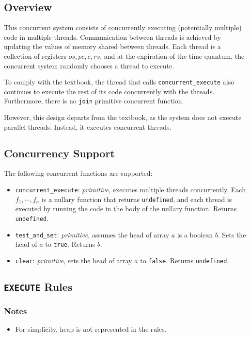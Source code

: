 \subsection{Overview}
\label{sec:org3a177cd}
This concurrent system consists of concurrently executing (potentially multiple) code in multiple threads. Communication between threads is achieved by updating the values of memory shared between threads. Each thread is a collection of registers \(\textit{os}, \textit{pc}, \textit{e}, \textit{rs}\), and at the expiration of the time quantum, the concurrent system randomly chooses a thread to execute.

To comply with the textbook, the thread that calls \texttt{concurrent\_execute} also continues to execute the rest of its code concurrently with the threads. Furthermore, there is no \texttt{join} primitive concurrent function.

However, this design departs from the textbook, as the system does not execute parallel threads. Instead, it executes concurrent threads.

\subsection{Concurrency Support}
\label{sec:orgaa84fb2}
The following concurrent functions are supported:
\begin{itemize}
\item \texttt{concurrent\_execute}: \textit{primitive}, executes multiple threads concurrently. Each \(f_1, \cdots ,f_n\) is a nullary function that returns \texttt{undefined}, and each thread is executed by running the code in the body of the nullary function. Returns \texttt{undefined}.
\item \texttt{test\_and\_set}: \textit{primitive}, assumes the head of array \(a\) is a boolean \(b\). Sets the head of \(a\) to \texttt{true}. Returns \(b\).
\item \texttt{clear}: \textit{primitive}, sets the head of array \(a\) to \texttt{false}. Returns \texttt{undefined}.
\end{itemize}

\subsection{\texttt{EXECUTE} Rules}
\label{sec:org9d11a1b}

\subsubsection{Notes}
\label{sec:org7100746}
\begin{itemize}
\item For simplicity, heap is not represented in the rules.
\end{itemize}

